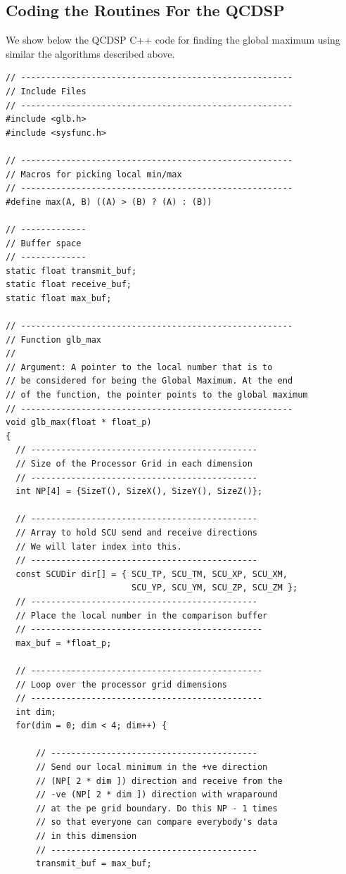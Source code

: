 \subsection{Coding the Routines For the QCDSP}
We show below the QCDSP C++ code for finding the global maximum
using similar the algorithms described above.
\begin{verbatim}
// ------------------------------------------------------
// Include Files
// ------------------------------------------------------
#include <glb.h>
#include <sysfunc.h>

// ------------------------------------------------------
// Macros for picking local min/max
// ------------------------------------------------------
#define max(A, B) ((A) > (B) ? (A) : (B))

// -------------
// Buffer space 
// -------------
static float transmit_buf;
static float receive_buf;
static float max_buf;

// ------------------------------------------------------
// Function glb_max
//
// Argument: A pointer to the local number that is to
// be considered for being the Global Maximum. At the end
// of the function, the pointer points to the global maximum
// ------------------------------------------------------
void glb_max(float * float_p)
{
  // ---------------------------------------------
  // Size of the Processor Grid in each dimension
  // ---------------------------------------------
  int NP[4] = {SizeT(), SizeX(), SizeY(), SizeZ()};

  // ---------------------------------------------
  // Array to hold SCU send and receive directions
  // We will later index into this.
  // ---------------------------------------------
  const SCUDir dir[] = { SCU_TP, SCU_TM, SCU_XP, SCU_XM,
                         SCU_YP, SCU_YM, SCU_ZP, SCU_ZM };
  // ---------------------------------------------
  // Place the local number in the comparison buffer
  // ----------------------------------------------
  max_buf = *float_p;

  // ----------------------------------------------
  // Loop over the processor grid dimensions
  // ----------------------------------------------
  int dim;
  for(dim = 0; dim < 4; dim++) {

      // -----------------------------------------
      // Send our local minimum in the +ve direction
      // (NP[ 2 * dim ]) direction and receive from the
      // -ve (NP[ 2 * dim ]) direction with wraparound
      // at the pe grid boundary. Do this NP - 1 times
      // so that everyone can compare everybody's data
      // in this dimension
      // -----------------------------------------
      transmit_buf = max_buf;


\end{verbatim}
